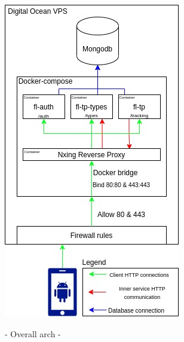 \documentclass{article}
\newcommand{\vspaceconst}{-2ex}
\begin{document}
\begin{multicols}{2}
\begingroup
\centering
\includegraphics[width=0.7\linewidth]{./charts/fitness-logger.jpg}
~\label{fig:FitnessLoggerChart}
\endgroup

- Overall arch
- 








\end{multicols}
\end{document}
